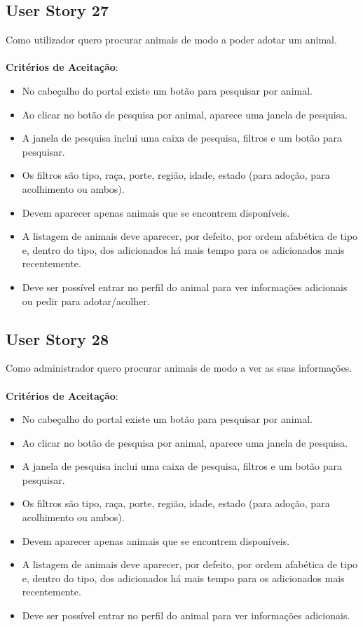 \documentclass[a4paper,11pt]{article}
\begin{document}
\subsection{User Story 27}
Como utilizador quero procurar animais de modo a poder adotar um animal.\\\\
\textbf{Critérios de Aceitação}:
\begin{itemize}
  \item No cabeçalho do portal existe um botão para pesquisar por animal.
  \item Ao clicar no botão de pesquisa por animal, aparece uma janela de pesquisa.
  \item A janela de pesquisa inclui uma caixa de pesquisa, filtros e um botão para pesquisar.
  \item Os filtros são tipo, raça, porte, região, idade, estado (para adoção, para acolhimento ou ambos).
  \item Devem aparecer apenas animais que se encontrem disponíveis.
  \item A listagem de animais deve aparecer, por defeito, por ordem afabética de tipo e, dentro do tipo, dos adicionados há mais tempo para os adicionados mais recentemente.
  \item Deve ser possível entrar no perfil do animal para ver informações adicionais ou pedir para adotar/acolher.
\end{itemize}

\subsection{User Story 28}
Como administrador quero procurar animais de modo a ver as suas informações.\\\\
\textbf{Critérios de Aceitação}:
\begin{itemize}
  \item No cabeçalho do portal existe um botão para pesquisar por animal.
  \item Ao clicar no botão de pesquisa por animal, aparece uma janela de pesquisa.
  \item A janela de pesquisa inclui uma caixa de pesquisa, filtros e um botão para pesquisar.
  \item Os filtros são tipo, raça, porte, região, idade, estado (para adoção, para acolhimento ou ambos).
  \item Devem aparecer apenas animais que se encontrem disponíveis.
  \item A listagem de animais deve aparecer, por defeito, por ordem afabética de tipo e, dentro do tipo, dos adicionados há mais tempo para os adicionados mais recentemente.
  \item Deve ser possível entrar no perfil do animal para ver informações adicionais.
\end{itemize}
\end{document}

